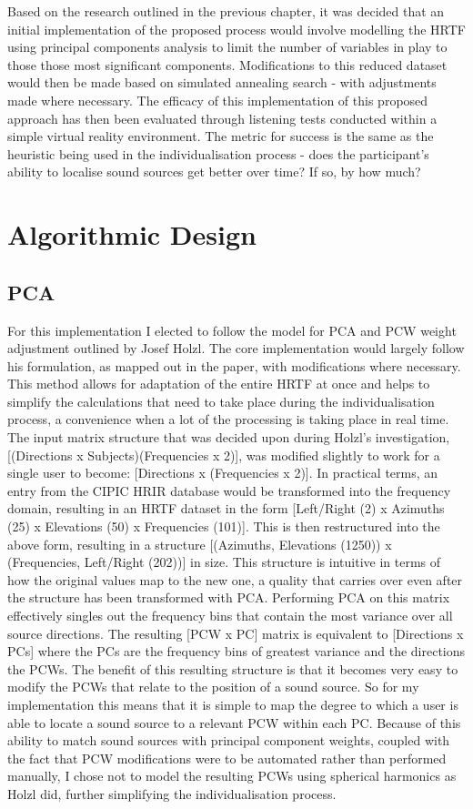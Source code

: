 Based on the research outlined in the previous chapter, it was decided that an initial implementation of the proposed process would involve modelling the HRTF using principal components analysis to limit the number of variables in play to those those most significant components. Modifications to this reduced dataset would then be made based on simulated annealing search - with adjustments made where necessary. The efficacy of this implementation of this proposed approach has then been evaluated through listening tests conducted within a simple virtual reality environment. The metric for success is the same as the heuristic being used in the individualisation process - does the participant's ability to localise sound sources get better over time? If so, by how much?

\section{Algorithmic Design}
\subsection{PCA}
For this implementation I elected to follow the model for PCA and PCW weight adjustment outlined by Josef Holzl\citep{Holzl2014a}. The core implementation would largely follow his formulation, as mapped out in the paper, with modifications where necessary. This method allows for adaptation of the entire HRTF at once and helps to simplify the calculations that need to take place during the individualisation process, a convenience when a lot of the processing is taking place in real time. The input matrix structure that was decided upon during Holzl's investigation, [(Directions x Subjects)(Frequencies x 2)], was modified slightly to work for a single user to become: [Directions x (Frequencies x 2)]. In practical terms, an entry from the CIPIC HRIR database would be transformed into the frequency domain, resulting in an HRTF dataset in the form [Left/Right (2) x Azimuths (25) x Elevations (50) x Frequencies (101)]. This is then restructured into the above form, resulting in a structure [(Azimuths, Elevations (1250)) x (Frequencies, Left/Right (202))] in size. This structure is intuitive in terms of how the original values map to the new one, a quality that carries over even after the structure has been transformed with PCA. Performing PCA on this matrix effectively singles out the frequency bins that contain the most variance over all source directions. The resulting [PCW x PC] matrix is equivalent to [Directions x PCs] where the PCs are the frequency bins of greatest variance and the directions the PCWs. The benefit of this resulting structure is that it becomes very easy to modify the PCWs that relate to the position of a sound source. So for my implementation this means that it is simple to map the degree to which a user is able to locate a sound source to a relevant PCW within each PC. Because of this ability to match sound sources with principal component weights, coupled with the fact that PCW modifications were to be automated rather than performed manually, I chose not to model the resulting PCWs using spherical harmonics as Holzl did, further simplifying the individualisation process. 


